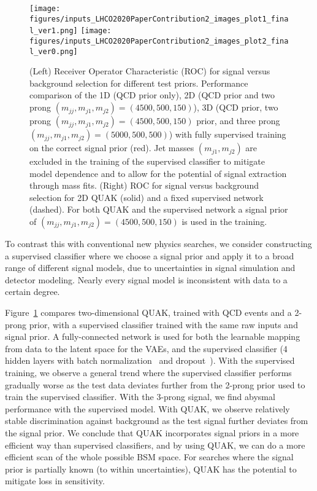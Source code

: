 \documentclass[a4paper,11pt]{article}
\begin{document}
\begin{figure}[htbp]
\centering
\texttt{[image: figures/inputs\_LHCO2020PaperContribution2\_images\_plot1\_final\_ver1.png]}
\texttt{[image: figures/inputs\_LHCO2020PaperContribution2\_images\_plot2\_final\_ver0.png]}
  \caption{(Left) Receiver Operator Characteristic (ROC) for signal versus background selection for different test priors. Performance comparison of the 1D (QCD prior only), 2D (QCD prior and two prong $(m_{jj},m_{j1},m_{j2}) = (4500,500,150)$), 3D (QCD prior, two prong $(m_{jj},m_{j1},m_{j2}) = (4500,500,150)$ prior, and three prong $(m_{jj},m_{j1},m_{j2}) = (5000,500,500)$) with fully supervised training on the correct signal prior (red). Jet masses $(m_{j1}, m_{j2})$ are excluded in the training of the supervised classifier to mitigate model dependence and to allow for the potential of signal extraction through mass fits. (Right) ROC for signal versus background selection for 2D QUAK (solid) and a fixed supervised network (dashed). For both QUAK and the supervised network a signal prior of $(m_{jj},m_{j1},m_{j2}) = (4500,500,150)$ is used in the training. }
  \label{fig:supexperiment}
\end{figure}


To contrast this with conventional new physics searches, we consider constructing a supervised classifier where we choose a signal prior and apply it to a broad range of different signal models, due to uncertainties in signal simulation and detector modeling. Nearly every signal model is inconsistent with data to a certain degree.

Figure~\ref{fig:supexperiment} compares two-dimensional QUAK, trained with QCD events and a 2-prong prior, with a supervised classifier trained with the same raw inputs and signal prior. A fully-connected network is used for both the learnable mapping from data to the latent space for the VAEs, and the supervised classifier (4 hidden layers with batch normalization~\cite{batchnorm} and dropout~\cite{hinton2012improving}). With the supervised training, we observe a general trend where the supervised classifier performs gradually worse as the test data deviates further from the 2-prong prior used to train the supervised classifier. With the 3-prong signal, we find abysmal performance with the supervised model. With QUAK, we observe relatively stable discrimination against background as the test signal further deviates from the signal prior. We conclude that QUAK incorporates signal priors in a more efficient way than supervised classifiers, and by using QUAK, we can do a more efficient scan of the whole possible BSM space. For searches where the signal prior is partially known (to within uncertainties), QUAK has the potential to mitigate loss in sensitivity. 
\end{document}
